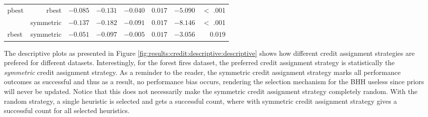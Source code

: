 \begin{table}[htbp]
{\begin{tabular}{lrrrrrrr}
                  pbest                & rbest                & $-0.085$             & $-0.131$                                        & $-0.040$             & $0.017$              & $-5.090$             & $<$ .001    \\
                  $ $                  & symmetric            & $-0.137$             & $-0.182$                                        & $-0.091$             & $0.017$              & $-8.146$             & $<$ .001    \\
                  rbest                & symmetric            & $-0.051$             & $-0.097$                                        & $-0.005$             & $0.017$              & $-3.056$             & $0.019$     \\
                  \bottomrule
            \end{tabular}
      }
\end{table}

The descriptive plots as presented in Figure \ref{fig:results:credit:descriptive:descriptive} shows how different credit assignment strategies are prefered for different datasets. Interestingly, for the forest fires dataset, the preferred credit assignment strategy is statistically the \textit{symmetric} credit assignment strategy. As a reminder to the reader, the symmetric credit assignment strategy marks all performance outcomes as successful and thus as a result, no performance bias occurs, rendering the selection mechanism for the \Ac{BHH} useless since priors will never be updated. Notice that this does not necessarily make the symmetric credit assignment strategy completely random. With the random strategy, a single heuristic is selected and gets a successful count, where with symmetric credit assignment strategy gives a successful count for all selected heuristics.


